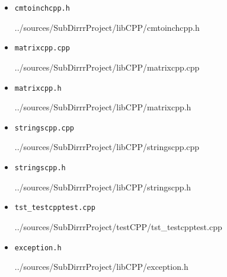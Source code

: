 \documentclass[12pt,a4paper]{report}
\begin{document}
\begin{itemize}
\item[] \verb-cmtoinchcpp.h-

{../sources/SubDirrrProject/libCPP/cmtoinchcpp.h}

%

%

\item[] \verb-matrixcpp.cpp-

{../sources/SubDirrrProject/libCPP/matrixcpp.cpp}

\item[] \verb-matrixcpp.h-

{../sources/SubDirrrProject/libCPP/matrixcpp.h}

\item[] \verb-stringscpp.cpp-

{../sources/SubDirrrProject/libCPP/stringscpp.cpp}

\item[] \verb-stringscpp.h-

{../sources/SubDirrrProject/libCPP/stringscpp.h}

\item[] \verb-tst_testcpptest.cpp-

{../sources/SubDirrrProject/testCPP/tst_testcpptest.cpp}

\item[] \verb-exception.h-

{../sources/SubDirrrProject/libCPP/exception.h}

\end{itemize}
\end{document}
